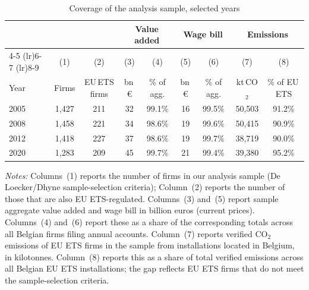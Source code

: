 \begin{table}[h]
    \centering
    \caption{Coverage of the analysis sample, selected years}
    \label{tab:sample_coverage}
    \small
    \begin{tabular}{l c c c c c c c c}
        \toprule
         & & & \multicolumn{2}{c}{Value added} & \multicolumn{2}{c}{Wage bill} & \multicolumn{2}{c}{Emissions} \\
        \cmidrule(lr){4-5} \cmidrule(lr){6-7} \cmidrule(lr){8-9}
         & (1) & (2) & (3) & (4) & (5) & (6) & (7) & (8) \\
        Year & Firms & EU\,ETS firms & bn\,\euro{} & \% of agg. & bn\,\euro{} & \% of agg. & kt\,CO$_2$ & \% of EU\,ETS \\
        \midrule\midrule
        2005 & 1,427 & 211 & 32 & 99.1\% & 16 & 99.5\% & 50,503 & 91.2\% \\ \midrule
        2008 & 1,458 & 221 & 34 & 98.6\% & 19 & 99.6\% & 50,415 & 90.9\% \\ \midrule
        2012 & 1,418 & 227 & 37 & 98.6\% & 19 & 99.7\% & 38,719 & 90.0\% \\ \midrule
        2020 & 1,283 & 209 & 45 & 99.7\% & 21 & 99.4\% & 39,380 & 95.2\% \\
        \bottomrule
    \end{tabular}
    \begin{minipage}{\textwidth}
        {\footnotesize \vspace{0.25cm} \noindent \textit{Notes:} Columns~(1) reports the number of firms in our analysis sample (De Loecker/Dhyne sample-selection criteria); Column~(2) reports the number of those that are also EU ETS-regulated. Columns~(3) and~(5) report sample aggregate value added and wage bill in billion euros (current prices). Columns~(4) and~(6) report these as a share of the corresponding totals across all Belgian firms filing annual accounts. Column~(7) reports verified CO$_2$ emissions of EU ETS firms in the sample from installations located in Belgium, in kilotonnes. Column~(8) reports this as a share of total verified emissions across all Belgian EU ETS installations; the gap reflects EU ETS firms that do not meet the sample-selection criteria.}
    \end{minipage}
\end{table}

